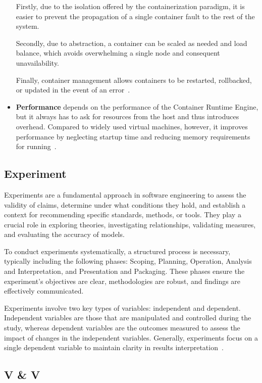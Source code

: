 \documentclass{article}
\begin{document}
\begin{multicols}{2}
\begin{itemize}
    Firstly, due to the isolation offered by the containerization paradigm, it is easier to prevent the propagation of a single container fault to the rest of the system.
    
    Secondly, due to abstraction, a container can be scaled as needed and load balance, which avoids overwhelming a single node and consequent unavailability.
    
    Finally, container management allows containers to be restarted, rollbacked, or updated in the event of an error~\cite{b1}.
    \item \textbf{Performance} depends on the performance of the Container Runtime Engine, but it always has to ask for resources from the host and thus introduces overhead. Compared to widely used virtual machines, however, it improves performance by neglecting startup time and reducing memory requirements for running~\cite{b1}.
\end{itemize}

\subsection{Experiment}
\color{black}
Experiments are a fundamental approach in software engineering to assess the validity of claims, determine under what conditions they hold, and establish a context for recommending specific standards, methods, or tools. They play a crucial role in exploring theories, investigating relationships, validating measures, and evaluating the accuracy of models.

To conduct experiments systematically, a structured process is necessary, typically including the following phases: Scoping, Planning, Operation, Analysis and Interpretation, and Presentation and Packaging. These phases ensure the experiment's objectives are clear, methodologies are robust, and findings are effectively communicated.

Experiments involve two key types of variables: independent and dependent. Independent variables are those that are manipulated and controlled during the study, whereas dependent variables are the outcomes measured to assess the impact of changes in the independent variables. Generally, experiments focus on a single dependent variable to maintain clarity in results interpretation~\cite{b14}.

\subsection{V \& V }
\color{black}


\end{multicols}
\end{document}
